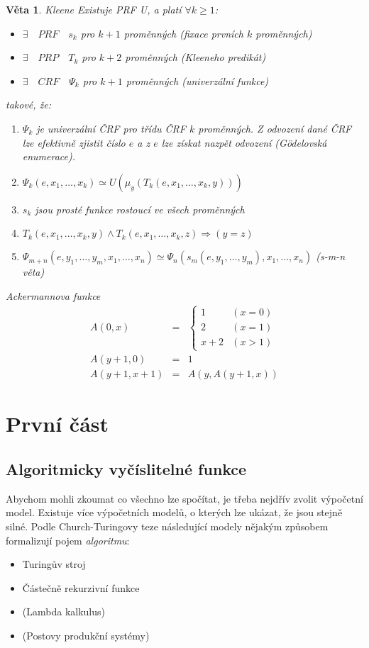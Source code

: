 \documentclass[a4paper]{article}      %
\newtheorem{theorem}{Věta}[section]
\newenvironment{definition}[1][Definice]{\begin{trivlist}
\item[\hskip \labelsep {\bfseries #1}]}{\end{trivlist}}
\begin{document}
\begin{theorem} \emph{Kleene}
Existuje PRF U, a platí $\forall k \geq 1$:
\begin{itemize}
\item $\exists\quad PRF\quad s_k$ pro $k+1$ proměnných (fixace prvních $k$ proměnných)
\item $\exists\quad PRP\quad T_k$ pro $k+2$ proměnných (Kleeneho predikát)
\item $\exists\quad CRF\quad \Psi_k$ pro $k+1$ proměnných (univerzální funkce)             
\end{itemize}
takové, že:
\begin{enumerate}
\item $\Psi_k$ je univerzální ČRF pro třídu ČRF $k$ proměnných. Z odvození dané ČRF lze efektivně zjistit číslo $e$ a z $e$ lze získat nazpět odvození (Gödelovská enumerace).
\item $\Psi_k (e,x_1,\ldots,x_k) \simeq U(\mu_y(T_k(e,x_1,\ldots,x_k,y)))$
\item $s_k$ jsou prosté funkce rostoucí ve všech proměnných
\item $T_k(e,x_1,\ldots,x_k,y)\wedge T_k(e,x_1,\ldots,x_k,z) \Rightarrow (y=z)$
\item $\Psi_{m+n} (e,y_1,\ldots,y_m,x_1,\ldots,x_n) \simeq
\Psi_n (s_m(e,y_1,\ldots,y_m),x_1,\ldots,x_n)$ (s-m-n věta)   
\end{enumerate}
\end{theorem}

\begin{definition} \emph{Ackermannova funkce}
\begin{eqnarray*}
A(0,x) & = &
\left\{
\begin{array}{ll}
1 & (x = 0)\\
2 & (x = 1)\\
x+2 & (x > 1)
\end{array}
\right.\\
A(y+1,0) & = & 1\\
A(y+1,x+1) & = & A(y,A(y+1,x))
\end{eqnarray*}
\end{definition}

\section{První část}

\subsection{Algoritmicky vyčíslitelné funkce}
Abychom mohli zkoumat co všechno lze spočítat, je třeba nejdřív zvolit výpočetní model.
Existuje více výpočetních modelů, o kterých lze ukázat, že jsou stejně silné. Podle Church-Turingovy teze následující modely nějakým způsobem formalizují pojem \emph{algoritmu}:
\begin{itemize}
	\item Turingův stroj
	\item Částečně rekurzivní funkce
	\item (Lambda kalkulus)
	\item (Postovy produkční systémy)
\end{itemize}
\end{document}
